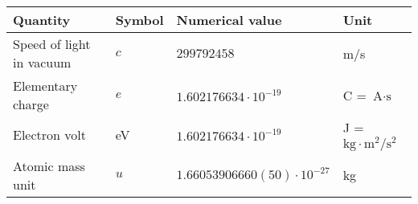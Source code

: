 \begin{tabular}{llll}
\hline
Quantity                 & Symbol & Numerical value                    & Unit \\
\hline
Speed of light in vacuum & $c$    & $299792458$                        & m/s                                       \\
Elementary charge        & $e$    & $1.602176634 \cdot 10^{-19}$       & C = $\text{A}\cdot\text{s}$               \\
Electron volt            &  eV    & $1.602176634 \cdot 10^{-19}$       & J = $\text{kg}\cdot\text{m}^2/\text{s}^2$ \\
Atomic mass unit         & $u$    & $1.66053906660(50) \cdot 10^{-27}$ & kg                                        \\
\hline
\end{tabular}